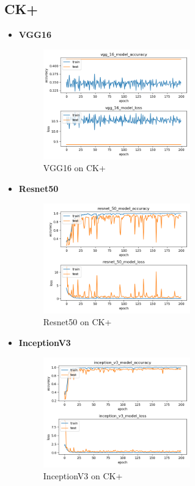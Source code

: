 \documentclass[11pt]{article}
\begin{document}
	\subsection{CK+}
	\begin{itemize}
		\item \textbf{VGG16}
		\begin{figure}[ht]
			\centering
			\includegraphics[width=0.6\textwidth]{vgg16_res}
			\caption{VGG16 on CK+}
		\end{figure}

		\item \textbf{Resnet50}
		\begin{figure}[ht]
			\centering
			\includegraphics[width=0.6\textwidth]{resnet50_res}
			\caption{Resnet50 on CK+}
		\end{figure}
	\newpage
		
		\item \textbf{InceptionV3}
		\begin{figure}[ht]
			\centering
			\includegraphics[width=0.6\textwidth]{inceptionV3_res}
			\caption{InceptionV3 on CK+}
		\end{figure}
	

\end{itemize}
\end{document}
